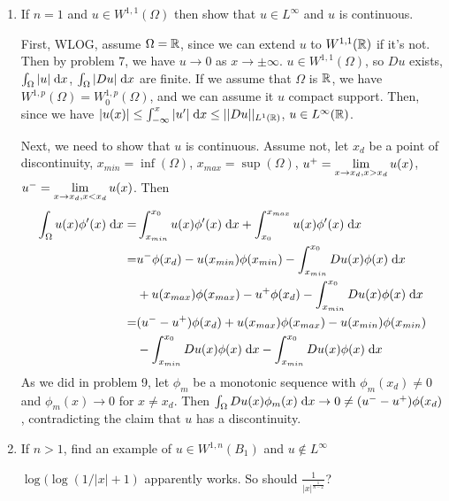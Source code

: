 \begin{enumerate}
\item
  If $n = 1$ and $u \in W^{1, 1}(\Omega)$ then show that $u \in L^\infty$ and $u$ is continuous.

  First, WLOG, assume $\Omega = \mathbb{R}$, since we can extend $u$ to $W^{1, 1}(\mathbb{R})$ if it's not.
  Then by problem 7, we have $u \rightarrow 0$ as $x \rightarrow \pm \infty$.
  $u \in W^{1, 1}(\Omega)$, so $D u$ exists, $\int_\Omega |u| \;\mathrm{d}x$, $\int_\Omega |D u| \;\mathrm{d}x$ are finite.
  If we assume that $\Omega$ is $\mathbb{R}$, we have $W^{1, p}(\Omega) = W^{1, p}_0(\Omega)$,
  and we can assume it $u$ compact support.
  Then, since we have $|u(x)| \leq \int_{-\infty}^x |u'| \;\mathrm{d}x \leq ||D u||_{L^1(\mathbb{R})}$, $u \in L^\infty(\mathbb{R})$.

  Next, we need to show that $u$ is continuous.
  Assume not, let $x_d$ be a point of discontinuity, $x_{min} = \inf(\Omega)$, $x_{max} = \sup(\Omega)$,
  $u^+ = \lim \limits_{x \rightarrow x_d, x > x_d} u(x)$, $u^- = \lim \limits_{x \rightarrow x_d, x < x_d} u(x)$.
  Then
  \begin{align*}
    \int_{\Omega} u(x) \phi'(x) \;\mathrm{d}x = &\int_{x_{min}}^{x_0} u(x) \phi'(x) \;\mathrm{d}x + \int_{x_0}^{x_{max}} u(x) \phi'(x) \;\mathrm{d}x\\
                                   = &u^- \phi(x_d) - u(x_{min}) \phi(x_{min}) - \int_{x_{min}}^{x_0} D u(x) \phi(x) \;\mathrm{d}x\\
                                      &+ u(x_{max}) \phi(x_{max}) - u^+ \phi(x_{d}) - \int_{x_{min}}^{x_0} D u(x) \phi(x) \;\mathrm{d}x\\
                                   = &(u^- - u^+) \phi(x_d) + u(x_{max}) \phi(x_{max}) - u(x_{min}) \phi(x_{min})\\
                                      &- \int_{x_{min}}^{x_0} D u(x) \phi(x) \;\mathrm{d}x - \int_{x_{min}}^{x_0} D u(x) \phi(x) \;\mathrm{d}x
  \end{align*}
  As we did in problem 9, let $\phi_m$ be a monotonic sequence with $\phi_m(x_d) \neq 0$
  and $\phi_m(x) \rightarrow 0$ for $x \neq x_d$.
  Then $\int_\Omega D u(x) \phi_m(x) \;\mathrm{d}x \rightarrow 0 \neq (u^- - u^+) \phi(x_d)$,
  contradicting the claim that $u$ has a discontinuity.

\item
  If $n > 1$, find an example of $u \in W^{1, n}(B_1)$ and $u \notin L^\infty$

  $\log(\log(1 / |x| + 1)$ apparently works. So should $\frac{1}{|x|^{\frac{1}{n - 2}}}$?

\end{enumerate}
